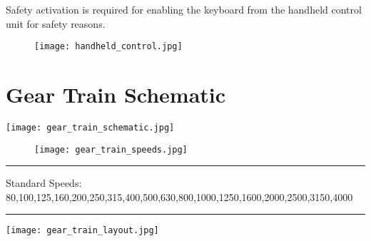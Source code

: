 \noindent
Safety activation is required for enabling the keyboard from the handheld control unit for safety reasons.

\vspace{0.3cm}


\vspace{0.3cm}


\vspace{-0.6cm}

\begin{center}
\end{center}

\vspace{-0.5cm}

\begin{figure}[h]
    \centering
    \texttt{[image: handheld\_control.jpg]}
\end{figure}

\section{Gear Train Schematic}
\setcounter{section}{10}
\begin{minipage}{\textwidth}
    \begin{adjustwidth}{-2cm}{-3cm}
        \centering
        \texttt{[image: gear\_train\_schematic.jpg]}
    \end{adjustwidth}
    \label{fig:gear_train}
\end{minipage}


\vspace{-.5cm}

\begin{figure}[h]
    \centering
    \texttt{[image: gear\_train\_speeds.jpg]}
\end{figure}

\noindent \rule{1.08\textwidth}{0.5pt}
\footnotesize Standard Speeds: 80,100,125,160,200,250,315,400,500,630,800,1000,1250,1600,2000,2500,3150,4000
\rule{1.08\textwidth}{0.5pt}

\vspace{.5cm}

\texttt{[image: gear\_train\_layout.jpg]}

